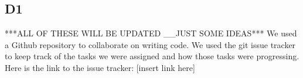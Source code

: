 \subsection{D1}
    ***ALL OF THESE WILL BE UPDATED __JUST SOME IDEAS***
    We used a Github repository to collaborate on writing code. We used the git issue tracker to keep track of the tasks we were assigned and how those tasks were progressing. Here is the link to the issue tracker: [insert link here]